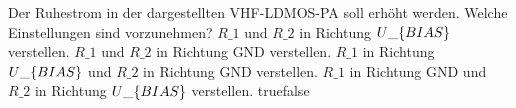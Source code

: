     {Der Ruhestrom in der dargestellten VHF-LDMOS-PA soll erhöht werden. Welche Einstellungen sind vorzunehmen?}
    {$R\_1$ und $R\_2$ in Richtung $U\_\text\{BIAS\}$ verstellen.}
    {$R\_1$ und $R\_2$ in Richtung GND verstellen.}
    {$R\_1$ in Richtung $U\_\text\{BIAS\}$ und $R\_2$ in Richtung GND verstellen.}
    {$R\_1$ in Richtung GND und $R\_2$ in Richtung $U\_\text\{BIAS\}$ verstellen.}
    {true}{false}